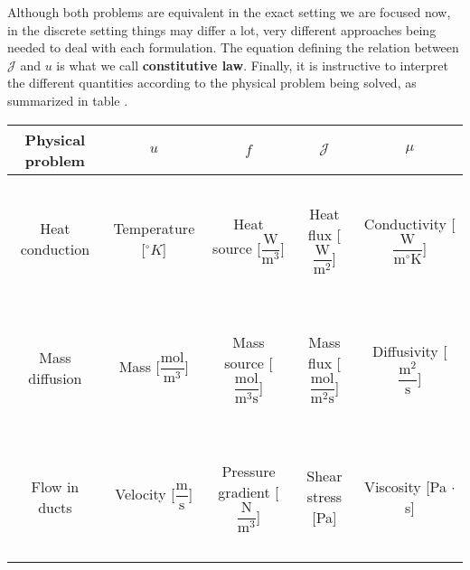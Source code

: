 Although both problems are equivalent in the exact setting we are
focused now, in the discrete setting things may differ a lot,
very different approaches being needed to deal with each formulation.
The equation defining the relation between $\boldsymbol{\mathcal{J}}$
and $u$ is what we call \textbf{constitutive law}.
Finally, it is instructive to interpret the different
quantities according to the physical problem being solved,
as summarized in table .

\begin{table*}[ht]
\caption[]{Physical interpretation of quantities in Poisson's problem. Units in SI.}
\begin{tabular}{ c c c c c }
	\toprule
	Physical problem & $u$ & $f$ & $\boldsymbol{\mathcal{J}}$ & $\mu$  \\
	\midrule
	\multirow{3}{4em}{Heat conduction} & ~ & ~ & ~ & ~ \\
                                           & Temperature [{\footnotesize $^\circ K$}] & Heat source {\footnotesize [$\dfrac{\mbox{W}}{\mbox{m}^{3}}$]}  & Heat flux {\footnotesize [$\dfrac{\mbox{W}}{\mbox{m}^{2}}$]} & Conductivity {\footnotesize [$\dfrac{\mbox{W}}{\mbox{m} ^\circ \mbox{K}}$]} \\ 
                                           ~ & ~ & ~ & ~ & \\
	\multirow{3}{4em}{Mass diffusion} & ~ & ~ & ~& ~ \\
                                          & Mass {\footnotesize [$\dfrac{\mbox{mol}}{\mbox{m}^{3}}$]} & Mass source {\footnotesize [$\dfrac{\mbox{mol}}{\mbox{m}^{3}\mbox{s}}$]} & Mass flux {\footnotesize [$\dfrac{\mbox{mol}}{\mbox{m}^{2}\mbox{s}}$]}  & Diffusivity {\footnotesize [$\dfrac{\mbox{m}^2}{\mbox{s}}$]} \\ 
                                        ~ & ~ & ~ & ~ & \\
        \multirow{3}{4em}{Flow in ducts}  & ~ & ~ & ~& ~ \\
                                          & Velocity {\footnotesize [$\dfrac{\mbox{m}}{\mbox{s}}$]} & Pressure gradient {\footnotesize [$\dfrac{\mbox{N}}{\mbox{m}^3}$]} & Shear stress {\footnotesize [Pa]}  & Viscosity {\footnotesize [Pa $\cdot$ s]} \\ 
                                       ~  & ~ & ~ & ~ & \\
	\bottomrule
\end{tabular}
\end{table*}

